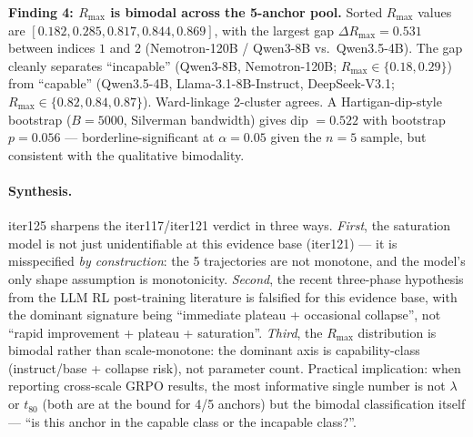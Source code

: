 \textbf{Finding 4: $R_\mathrm{max}$ is bimodal across the 5-anchor
pool.}  Sorted $R_\mathrm{max}$ values are
$[0.182, 0.285, 0.817, 0.844, 0.869]$, with the largest gap
$\Delta R_\mathrm{max} = 0.531$ between indices $1$ and $2$
(Nemotron-120B / Qwen3-8B vs.\ Qwen3.5-4B).  The gap cleanly
separates ``incapable'' (Qwen3-8B, Nemotron-120B;
$R_\mathrm{max} \in \{0.18, 0.29\}$) from ``capable'' (Qwen3.5-4B,
Llama-3.1-8B-Instruct, DeepSeek-V3.1;
$R_\mathrm{max} \in \{0.82, 0.84, 0.87\}$).  Ward-linkage 2-cluster
agrees.  A Hartigan-dip-style bootstrap ($B = 5000$, Silverman
bandwidth) gives dip $= 0.522$ with bootstrap $p = 0.056$ ---
borderline-significant at $\alpha = 0.05$ given the $n=5$ sample,
but consistent with the qualitative bimodality.

\paragraph{Synthesis.}  iter125 sharpens the iter117/iter121 verdict
in three ways.  \emph{First}, the saturation model is not just
unidentifiable at this evidence base (iter121) --- it is misspecified
\emph{by construction}: the 5 trajectories are not monotone, and the
model's only shape assumption is monotonicity.  \emph{Second}, the
recent three-phase hypothesis from the LLM RL post-training literature
is falsified for this evidence base, with the dominant signature being
``immediate plateau + occasional collapse'', not
``rapid improvement + plateau + saturation''.  \emph{Third}, the
$R_\mathrm{max}$ distribution is bimodal rather than
scale-monotone: the dominant axis is capability-class
(instruct/base + collapse risk), not parameter count.  Practical
implication: when reporting cross-scale GRPO results, the most
informative single number is not $\lambda$ or $t_{80}$ (both are at
the bound for 4/5 anchors) but the bimodal classification itself ---
``is this anchor in the capable class or the incapable class?''.
